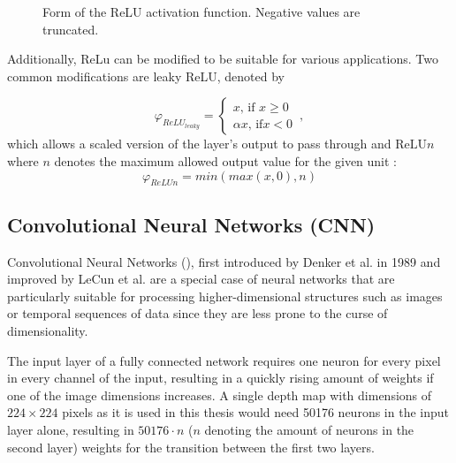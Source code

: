 		\begin{figure}[ht]
			\centering
			\caption{Form of the ReLU activation function. Negative values are truncated.}
			\label{fig:relu_plot}
		\end{figure}
		
		Additionally, ReLu can be modified to be suitable for various applications. Two common modifications are leaky ReLU, denoted by 
		
		\begin{equation}
		\varphi_{ReLU_{leaky}} = \begin{cases}
		x \text{, if } x \geq 0 \\
		\alpha x \text{, if} x < 0
		\end{cases} \,,
		\end{equation} 
		which allows a scaled version of the layer's output to pass through and $\text{ReLU}n$ where $n$ denotes the maximum allowed output value for the given unit \cite{Sandler}:
		\begin{equation}
		\varphi_{ReLUn} = min(max(x, 0), n)
		\end{equation}
	
	
	\subsection { Convolutional Neural Networks (CNN) }
		Convolutional Neural Networks (), first introduced by Denker et al. in 1989 \cite{Denker1988} and improved by LeCun et al. \cite{LeCun1989} are a special case of neural networks that are particularly suitable for processing higher-dimensional structures such as images or temporal sequences of data since they are less prone to the curse of dimensionality.
		
		The input layer of a fully connected network requires one neuron for every pixel in every channel of the input, resulting in a quickly rising amount of weights if one of the image dimensions increases. A single depth map with dimensions of $224 \times 224$ pixels as it is used in this thesis would need 50176 neurons in the input layer alone, resulting in $50176 \cdot n$ ($n$ denoting the amount of neurons in the second layer) weights for the transition between the first two layers. 
		
